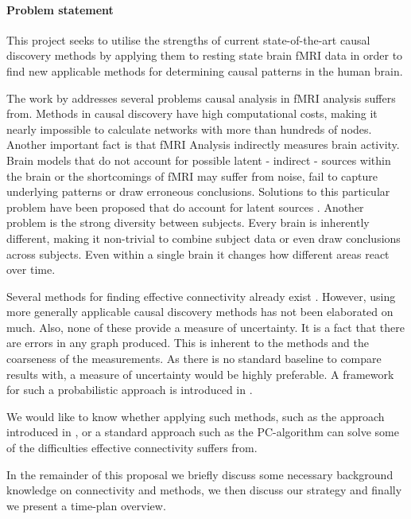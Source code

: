 \documentclass[a4paper, 10pt, english, onecolumn]{article}
\begin{document}
\paragraph{Problem statement}
This project seeks to utilise the strengths of current state-of-the-art causal discovery methods by applying them to resting state brain fMRI data in order to find new applicable methods for determining causal patterns in the human brain.

The work by \cite{ramsey2010} addresses several problems causal analysis in fMRI analysis suffers from.
Methods in causal discovery have high computational costs, making it nearly impossible to calculate networks with more than hundreds of nodes.
Another important fact is that fMRI Analysis indirectly measures brain activity.
Brain models that do not account for possible latent - indirect - sources within the brain or the shortcomings of fMRI may suffer from noise, fail to capture underlying patterns or draw erroneous conclusions.
Solutions to this particular problem have been proposed that do account for latent sources \cite{ramsey2010, waldorp2011}.
Another problem is the strong diversity between subjects.
Every brain is inherently different, making it non-trivial to combine subject data or even draw conclusions across subjects.
Even within a single brain it changes how different areas react over time.

Several methods for finding effective connectivity already exist \cite{mclntosh1994, harrison2003, friston2003, roebroeck2005}.
However, using more generally applicable causal discovery methods has not been elaborated on much.
Also, none of these provide a measure of uncertainty.
It is a fact that there are errors in any graph produced.
This is inherent to the methods and the coarseness of the measurements.
As there is no standard baseline to compare results with, a measure of uncertainty would be highly preferable.
A framework for such a probabilistic approach is introduced in \cite{claassen2012}.

We would like to know whether applying such methods, such as the approach introduced in \cite{claassen2012}, or a standard approach such as the PC-algorithm \cite{spirtes2000} can solve some of the difficulties effective connectivity suffers from.

In the remainder of this proposal we briefly discuss some necessary background knowledge on connectivity and methods, we then discuss our strategy and finally we present a time-plan overview.
\end{document}
